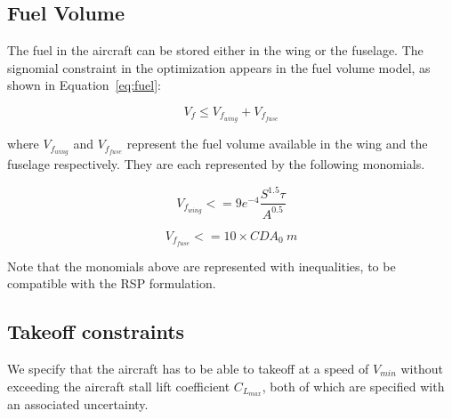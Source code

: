 \subsection{Fuel Volume}
The fuel in the aircraft can be stored either in the wing or the fuselage. The signomial constraint in the optimization appears in the fuel volume model, as shown in Equation~\ref{eq:fuel}:

\begin{equation}
\label{eq:fuel}
V_f \leq V_{f_{wing}} + V_{f_{fuse}} 
\end{equation}

where $V_{f_{wing}}$ and $V_{f_{fuse}}$ represent the fuel volume available in the wing and the fuselage respectively. They are each represented by the following monomials. 

\begin{equation}
\label{eq:fuelwing}
V_{f_{wing}} <= 9e^{-4}\frac{S^{1.5}\tau}{A^{0.5}}
\end{equation}

\begin{equation}
\label{eq:fuelfuse}
V_{f_{fuse}} <= 10 \times CDA_0~m
\end{equation}

Note that the monomials above are represented with inequalities, to be compatible with the RSP formulation. 

\subsection{Takeoff constraints}
We specify that the aircraft has to be able to takeoff at a speed of $V_{min}$ without exceeding the aircraft stall lift coefficient $C_{L_{max}}$, both of which are specified with an associated uncertainty. 